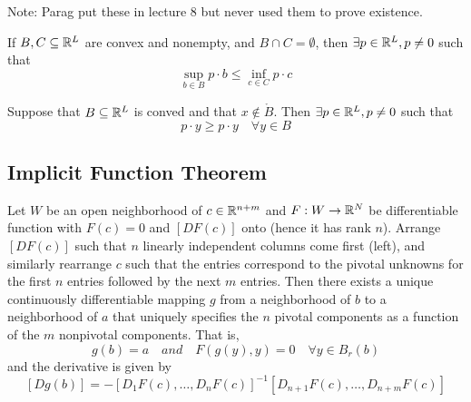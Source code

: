 Note: Parag put these in lecture 8 but never used them to prove
existence.

\begin{theorem}
  If $B, C \subseteq {\mathbb R}^L$ are convex and nonempty, and $B \cap C =
  \emptyset$, then $\exists p \in {\mathbb R}^L, p \neq 0$ such that
  \[
  \sup_{b \in B} p \cdot b \leq \inf_{c \in C} p \cdot c
  \]
\end{theorem}

\begin{theorem}
  Suppose that $B \subseteq {\mathbb R}^L$ is conved and that $x \not\in
  \mathring B$. Then $\exists p \in {\mathbb R}^L, p \neq 0$ such that 
  \[
  p \cdot y \geq p \cdot y \quad \forall y \in B
  \]
\end{theorem}


\subsection{Implicit Function Theorem}
\label{sec:impl-funct-theor}

\begin{definition}
Let $W$ be an open neighborhood of $c \in {\mathbb R}^{n+m}$ and $F:W \to {\mathbb R}^N$
be differentiable function with $F(c) = 0$ and $[DF(c)]$ onto (hence
it has rank $n$). Arrange $[DF(c)]$ such that $n$ linearly independent
columns come first (left), and similarly rearrange $c$ such that the
entries correspond to the pivotal unknowns for the first $n$ entries
followed by the next $m$ entries. Then there exists a unique
continuously differentiable mapping $g$ from a neighborhood of $b$ to
a neighborhood of $a$ that uniquely specifies the $n$ pivotal
components as a function of the $m$ nonpivotal components. That is,
\[
g(b) = a \quad and \quad F(g(y), y) = 0 \quad \forall y \in B_r(b)
\]
and the derivative is given by
\[
[Dg(b)] = -[D_1F(c), \dots, D_nF(c)]^{-1}[D_{n+1}F(c), \dots, D_{n+m}F(c)]
\]
  
\end{definition}
